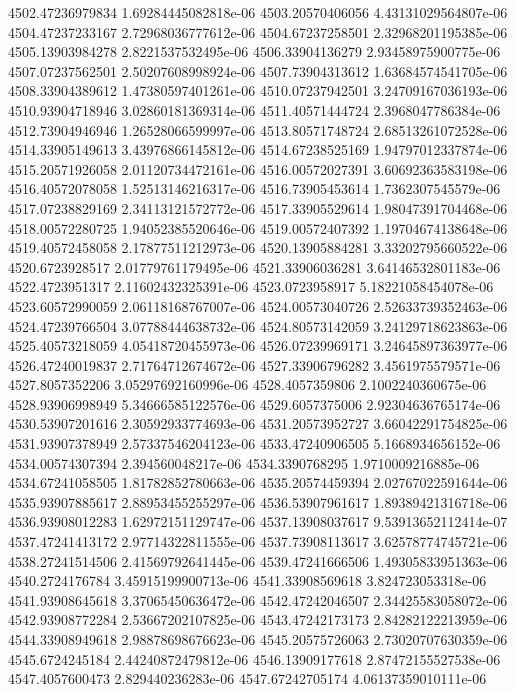 {4502.47236979834 1.69284445082818e-06
4503.20570406056 4.43131029564807e-06
4504.47237233167 2.72968036777612e-06
4504.67237258501 2.32968201195385e-06
4505.13903984278 2.8221537532495e-06
4506.33904136279 2.93458975900775e-06
4507.07237562501 2.50207608998924e-06
4507.73904313612 1.63684574541705e-06
4508.33904389612 1.47380597401261e-06
4510.07237942501 3.24709167036193e-06
4510.93904718946 3.02860181369314e-06
4511.40571444724 2.3968047786384e-06
4512.73904946946 1.26528066599997e-06
4513.80571748724 2.68513261072528e-06
4514.33905149613 3.43976866145812e-06
4514.67238525169 1.94797012337874e-06
4515.20571926058 2.01120734472161e-06
4516.00572027391 3.60692363583198e-06
4516.40572078058 1.52513146216317e-06
4516.73905453614 1.7362307545579e-06
4517.07238829169 2.34113121572772e-06
4517.33905529614 1.98047391704468e-06
4518.00572280725 1.94052385520646e-06
4519.00572407392 1.19704674138648e-06
4519.40572458058 2.17877511212973e-06
4520.13905884281 3.33202795660522e-06
4520.6723928517 2.01779761179495e-06
4521.33906036281 3.64146532801183e-06
4522.4723951317 2.11602432325391e-06
4523.0723958917 5.18221058454078e-06
4523.60572990059 2.06118168767007e-06
4524.00573040726 2.52633739352463e-06
4524.47239766504 3.07788444638732e-06
4524.80573142059 3.24129718623863e-06
4525.40573218059 4.05418720455973e-06
4526.07239969171 3.24645897363977e-06
4526.47240019837 2.71764712674672e-06
4527.33906796282 3.4561975579571e-06
4527.8057352206 3.05297692160996e-06
4528.4057359806 2.1002240360675e-06
4528.93906998949 5.34666585122576e-06
4529.6057375006 2.92304636765174e-06
4530.53907201616 2.30592933774693e-06
4531.20573952727 3.66042291754825e-06
4531.93907378949 2.57337546204123e-06
4533.47240906505 5.1668934656152e-06
4534.00574307394 2.394560048217e-06
4534.3390768295 1.9710009216885e-06
4534.67241058505 1.81782852780663e-06
4535.20574459394 2.02767022591644e-06
4535.93907885617 2.88953455255297e-06
4536.53907961617 1.89389421316718e-06
4536.93908012283 1.62972151129747e-06
4537.13908037617 9.53913652112414e-07
4537.47241413172 2.97714322811555e-06
4537.73908113617 3.62578774745721e-06
4538.27241514506 2.41569792641445e-06
4539.47241666506 1.49305833951363e-06
4540.2724176784 3.45915199900713e-06
4541.33908569618 3.824723053318e-06
4541.93908645618 3.37065450636472e-06
4542.47242046507 2.34425583058072e-06
4542.93908772284 2.53667202107825e-06
4543.47242173173 2.84282122213959e-06
4544.33908949618 2.98878698676623e-06
4545.20575726063 2.73020707630359e-06
4545.6724245184 2.44240872479812e-06
4546.13909177618 2.87472155527538e-06
4547.4057600473 2.829440236283e-06
4547.67242705174 4.06137359010111e-06
}
